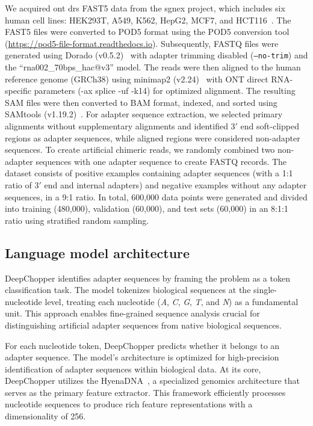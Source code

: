 \documentclass[pdflatex,sn-nature, lineno]{sn-jnl}%
\begin{document}
We acquired \gls{ont} \gls{drs} FAST5 data from the \gls{sgnex} project, which includes six human cell lines: HEK293T, A549, K562, HepG2, MCF7, and HCT116~\cite{chen2021systematic}.
The FAST5 files were converted to POD5 format using the POD5 conversion tool (\url{https://pod5-file-format.readthedocs.io}).
Subsequently, FASTQ files were generated using Dorado (v0.5.2)~\cite{dorado2023} with adapter trimming disabled (\texttt{--no-trim}) and the ``rna002\_70bps\_hac@v3'' model.
The reads were then aligned to the human reference genome (GRCh38) using minimap2 (v2.24)~\cite{li2018minimap2} with ONT direct RNA-specific parameters (-ax splice -uf -k14) for optimized alignment. The resulting SAM files were then converted to BAM format, indexed, and sorted using SAMtools (v1.19.2)~\cite{li2009sequence}.
For adapter sequence extraction, we selected primary alignments without supplementary alignments and identified $3'$ end soft-clipped regions as adapter sequences, while aligned regions were considered non-adapter sequences.
To create artificial chimeric reads, we randomly combined two non-adapter sequences with one adapter sequence to create FASTQ records.
The dataset consists of positive examples containing adapter sequences (with a 1:1 ratio of $3'$ end and internal adapters) and negative examples without any adapter sequences, in a 9:1 ratio.
In total, 600,000 data points were generated and divided into training (480,000), validation (60,000), and test sets (60,000) in an 8:1:1 ratio using stratified random sampling.

\subsection{Language model architecture}\label{ssec:lm}

DeepChopper identifies adapter sequences by framing the problem as a token classification task.
The model tokenizes biological sequences at the single-nucleotide level, treating each nucleotide (\emph{A}, \emph{C}, \emph{G}, \emph{T}, and \emph{N}) as a fundamental unit.
This approach enables fine-grained sequence analysis crucial for distinguishing artificial adapter sequences from native biological sequences.

For each nucleotide token, DeepChopper predicts whether it belongs to an adapter sequence.
The model's architecture is optimized for high-precision identification of adapter sequences within biological data.
At its core, DeepChopper utilizes the HyenaDNA~\cite{nguyen2024hyenadna}, a specialized genomics architecture that serves as the primary feature extractor.
This framework efficiently processes nucleotide sequences to produce rich feature representations with a dimensionality of 256.
\end{document}
